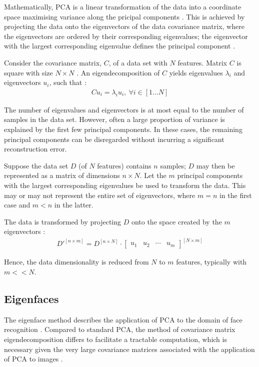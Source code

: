Mathematically, PCA is a linear transformation of the data into a coordinate space maximising variance along the pricipal components \cite{jolliffe_2002}. This is achieved by projecting the data onto the eigenvectors of the data covariance matrix, where the eigenvectors are ordered by their corresponding eigenvalues; the eigenvector with the largest corresponding eigenvalue defines the principal component \cite{rosebrock_2021}.

Consider the covariance matrix, $C$, of a data set with $N$ features. Matrix $C$ is square with size $N\times N$ \cite{lovell_2008}. An eigendecomposition of $C$ yields eigenvalues $\lambda_i$ and eigenvectors $u_i$, such that \cite{lovell_2008}:
\begin{align}
  C u_i = \lambda_i u_i,\ \forall i \in [1 \ldots N]
\end{align}

The number of eigenvalues and eigenvectors is at most equal to the number of samples in the data set. However, often a large proportion of variance is explained by the first few principal components. In these cases, the remaining principal components can be disregarded without incurring a significant reconstruction error.

Suppose the data set $D$ (of $N$ features) contains $n$ samples; $D$ may then be represented as a matrix of dimensions $n\times N$. Let the $m$ principal components with the largest corresponding eigenvalues be used to transform the data. This may or may not represent the entire set of eigenvectors, where $m=n$ in the first case and $m<n$ in the latter.

The data is transformed by projecting $D$ onto the space created by the $m$ eigenvectors \cite{rosebrock_2021}:
\begin{align}
  D'^{[n\times m]} = D^{[n\times N]} \cdot \begin{bmatrix} u_1 & u_2 & \cdots & u_m \end{bmatrix}^{[N\times m]}
\end{align}

Hence, the data dimensionality is reduced from $N$ to $m$ features, typically with $m<<N$.

\newpage
\subsection{Eigenfaces}

The eigenface method describes the application of PCA to the domain of face recognition \cite{lovell_2008}. Compared to standard PCA, the method of covariance matrix eigendecomposition differs to facilitate a tractable computation, which is necessary given the very large covariance matrices associated with the application of PCA to images \cite{lovell_2008}.

